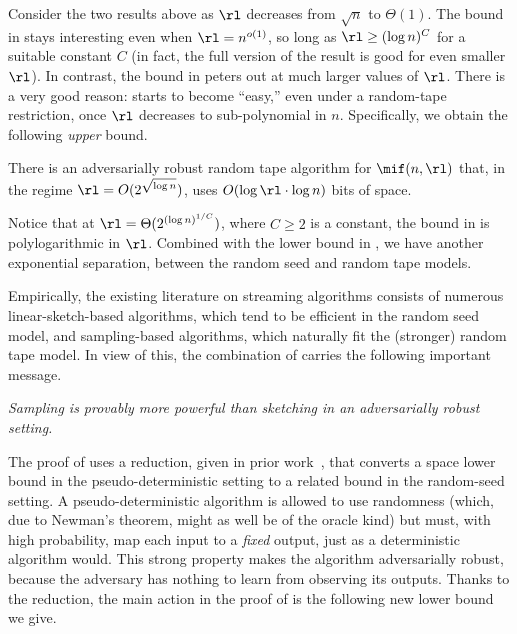 \begin{itemize}
\begin{itemize}
Consider the two results above as $\rl$ decreases from $\sqrt{n}$ to
$\Theta(1)$. The bound in  stays interesting even when $\rl =
n^{o(1)}$, so long as $\rl \ge (\log n)^C$ for a suitable constant $C$ (in
fact, the full version of the result is good for even smaller $\rl$). In
contrast, the bound in  peters out at much larger values of
$\rl$. There is a very good reason: \mif starts to become ``easy,'' even under
a random-tape restriction, once $\rl$ decreases to sub-polynomial in $n$.
Specifically, we obtain the following {\em upper} bound.

\begin{result} \label{res:rt-ub}
  There is an adversarially robust random tape algorithm for $\mif(n,\rl)$
  that, in the regime $\rl = O(2^{\sqrt{\log n}})$, uses $O(\log\rl \cdot \log
  n)$ bits of space.
\end{result}

Notice that at $\rl = \Theta(2^{(\log n)^{1/C}})$, where $C \ge 2$ is
a constant, the bound in  is polylogarithmic in $\rl$.
Combined with the lower bound in , we have another exponential
separation, between the random seed and random tape models.

Empirically, the existing literature on streaming algorithms consists of
numerous linear-sketch-based algorithms, which tend to be efficient in the
random seed model, and sampling-based algorithms, which naturally fit the
(stronger) random tape model. In view of this, the combination of
 carries the following important message.
\begin{center}\begin{minipage}{.8\linewidth}\begin{center}
  \emph{Sampling is provably more powerful than sketching in an adversarially
  robust setting.}
\end{center}\end{minipage}\end{center}

The proof of  uses a reduction, given in prior
work~\cite{Stoeckl23}, that converts a space lower bound in the
pseudo-deterministic setting to a related bound in the random-seed setting. A
pseudo-deterministic algorithm is allowed to use randomness (which, due to
Newman's theorem, might as well be of the oracle kind) but must, with high
probability, map each input to a {\em fixed} output, just as a deterministic
algorithm would. This strong property makes the algorithm adversarially
robust, because the adversary has nothing to learn from observing its outputs.
Thanks to the \cite{Stoeckl23} reduction, the main action in the proof of
 is the following new lower bound we give.


\end{itemize}
\end{itemize}
